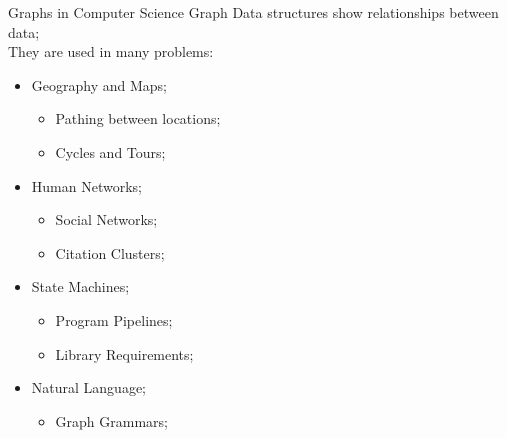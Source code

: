 \begin{frame}
\begin{columns}[T]
    \vspace{.5cm}


  \end{columns}
\end{frame}

\begin{frame}{Graphs in Computer Science}
  Graph Data structures show relationships between data;\\
  They are used in many problems:\bigskip

  \begin{itemize}
    \item Geography and Maps;
    \begin{itemize}
      \item Pathing between locations;
      \item Cycles and Tours;
    \end{itemize}
    \item Human Networks;
    \begin{itemize}
      \item Social Networks;
      \item Citation Clusters;
    \end{itemize}
    \item State Machines;
    \begin{itemize}
      \item Program Pipelines;
      \item Library Requirements;
    \end{itemize}
    \item Natural Language;
    \begin{itemize}
      \item Graph Grammars;
    \end{itemize}
  \end{itemize}
\end{frame}


